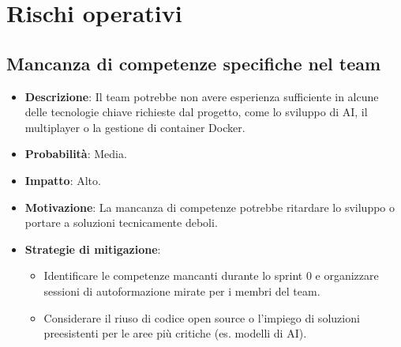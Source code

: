 \documentclass[12pt,a4paper]{report}
\begin{document}
\section{Rischi operativi}
\subsection{Mancanza di competenze specifiche nel team}
\begin{itemize}
    \item \textbf{Descrizione}:  Il team potrebbe non avere esperienza sufficiente in alcune delle tecnologie chiave richieste dal progetto, come lo sviluppo di AI, il multiplayer o la gestione di container Docker.
    \item \textbf{Probabilità}: Media.
    \item \textbf{Impatto}: Alto.
    \item \textbf{Motivazione}: La mancanza di competenze potrebbe ritardare lo sviluppo o portare a soluzioni tecnicamente deboli.
    \item \textbf{Strategie di mitigazione}:
    \begin{itemize}
        \item Identificare le competenze mancanti durante lo sprint 0 e organizzare sessioni di autoformazione mirate per i membri del team.
        \item Considerare il riuso di codice open source o l’impiego di soluzioni preesistenti per le aree più critiche (es. modelli di AI).
    \end{itemize}
\end{itemize}
\end{document}

